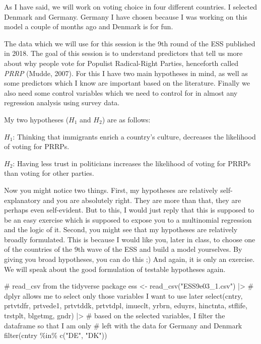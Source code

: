 \documentclass[
  letterpaper,
  DIV=11,
  numbers=noendperiod]{scrreprt}
\newenvironment{Shaded}{\begin{snugshade}}{\end{snugshade}}
\newcommand{\CommentTok}[1]{\textcolor[rgb]{0.37,0.37,0.37}{#1}}
\newcommand{\FunctionTok}[1]{\textcolor[rgb]{0.28,0.35,0.67}{#1}}
\newcommand{\NormalTok}[1]{\textcolor[rgb]{0.00,0.23,0.31}{#1}}
\newcommand{\OtherTok}[1]{\textcolor[rgb]{0.00,0.23,0.31}{#1}}
\newcommand{\SpecialCharTok}[1]{\textcolor[rgb]{0.37,0.37,0.37}{#1}}
\newcommand{\StringTok}[1]{\textcolor[rgb]{0.13,0.47,0.30}{#1}}
\begin{document}
As I have said, we will work on voting choice in four different
countries. I selected Denmark and Germany. Germany I have chosen because
I was working on this model a couple of months ago and Denmark is for
fun.

The data which we will use for this session is the 9th round of the ESS
published in 2018. The goal of this session is to understand predictors
that tell us more about why people vote for Populist Radical-Right
Parties, henceforth called \emph{PRRP} (Mudde, 2007). For this I have
two main hypotheses in mind, as well as some predictors which I know are
important based on the literature. Finally we also need some control
variables which we need to control for in almost any regression analysis
using survey data.

My two hypotheses (\(H_1\) and \(H_2\)) are as follows:

\begin{center}
$H_1$: Thinking that immigrants enrich a country's culture, decreases the likelihood of voting for PRRPs.
\end{center}

\begin{center}
$H_2$: Having less trust in politicians increases the likelihood of voting for PRRPs than voting for other parties.
\end{center}

Now you might notice two things. First, my hypotheses are relatively
self-explanatory and you are absolutely right. They are more than that,
they are perhaps even self-evident. But to this, I would just reply that
this is supposed to be an easy exercise which is supposed to expose you
to a multinomial regression and the logic of it. Second, you might see
that my hypotheses are relatively broadly formulated. This is because I
would like you, later in class, to choose one of the countries of the
9th wave of the ESS and build a model yourselves. By giving you broad
hypotheses, you can do this ;) And again, it is only an exercise. We
will speak about the good formulation of testable hypotheses again.

\begin{Shaded}
\begin{Highlighting}[]
\CommentTok{\# read\_csv from the tidyverse package}
\NormalTok{ess }\OtherTok{\textless{}{-}} \FunctionTok{read\_csv}\NormalTok{(}\StringTok{"ESS9e03\_1.csv"}\NormalTok{) }\SpecialCharTok{|\textgreater{}} 
  \CommentTok{\# dplyr allows me to select only those variables I want to use later}
  \FunctionTok{select}\NormalTok{(cntry, prtvtdfr, prtvede1, prtvtddk, prtvtdpl, }
\NormalTok{         imueclt, yrbrn, eduyrs, hinctnta, stflife, trstplt, }
\NormalTok{         blgetmg, gndr) }\SpecialCharTok{|\textgreater{}} 
  \CommentTok{\# based on the selected variables, I filter the dataframe so that I am only}
  \CommentTok{\# left with the data for Germany and Denmark}
  \FunctionTok{filter}\NormalTok{(cntry }\SpecialCharTok{\%in\%} \FunctionTok{c}\NormalTok{(}\StringTok{"DE"}\NormalTok{, }\StringTok{"DK"}\NormalTok{))}
\end{Highlighting}
\end{Shaded}
\end{document}
